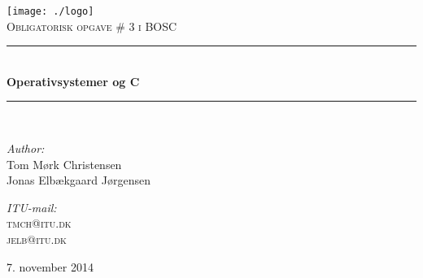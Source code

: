 \begin{titlepage}
\begin{center}


\texttt{[image: ./logo]}\\[1cm]

\textsc{\Large Obligatorisk opgave \# 3 i BOSC}\\[0.5cm]

\rule{\linewidth}{0.5mm} \\[0.3cm]
{ \LARGE \bfseries Operativsystemer og C\\[0.3cm]}
\rule{\linewidth}{0.5mm} \\[1.5cm]

\begin{minipage}{0.5\textwidth}
\begin{flushleft} \large
\emph{Author:}\\
Tom Mørk Christensen\\
Jonas Elbækgaard Jørgensen
\end{flushleft}
\end{minipage}
\begin{minipage}{0.3\textwidth}
\begin{flushright} \large
\emph{ITU-mail:} \\
\textsc{tmch@itu.dk} \\
\textsc{jelb@itu.dk}
\end{flushright}
\end{minipage}

\vfill

\large 7. november 2014

\end{center}
\end{titlepage}